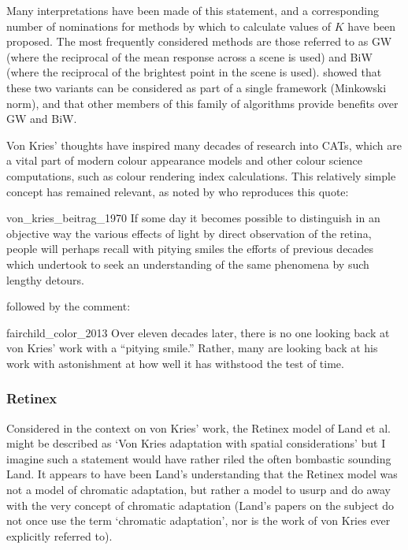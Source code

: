 Many interpretations have been made of this statement, and a corresponding number of nominations for methods by which to calculate values of $K$ have been proposed. The most frequently considered methods are those referred to as \acrfull{GW} (where the reciprocal of the mean response across a scene is used) and \acrfull{BiW} (where the reciprocal of the brightest point in the scene is used). \citet{finlayson_shades_2004} showed that these two variants can be considered as part of a single framework (Minkowski norm), and that other members of this family of algorithms provide benefits over \gls{GW} and \gls{BiW}.

Von Kries' thoughts have inspired many decades of research into \glspl{CAT}, which are a vital part of modern colour appearance models and other colour science computations, such as colour rendering index calculations. This relatively simple concept has remained relevant, as noted by \citet[p. 182]{fairchild_color_2013} who reproduces this quote:

\begin{citequote}{von_kries_beitrag_1970}
If some day it becomes possible to distinguish in an objective way the
various effects of light by direct observation of the retina, people will perhaps
recall with pitying smiles the efforts of previous decades which
undertook to seek an understanding of the same phenomena by such
lengthy detours.
\end{citequote}

followed by the comment:

\begin{citequote}{fairchild_color_2013}
Over eleven decades later, there is no one looking back at von Kries’ work
with a “pitying smile.” Rather, many are looking back at his work with
astonishment at how well it has withstood the test of time.
\end{citequote}

\subsubsection{Retinex}

Considered in the context on von Kries' work, the Retinex model of Land et al. \citep{land_retinex_1964,land_lightness_1971,land_recent_1983,land_recent_1986,mccann_quantitative_1976} might be described as `Von Kries adaptation with spatial considerations' but I imagine such a statement would have rather riled the often bombastic sounding Land. It appears to have been Land's understanding that the Retinex model was not a model of chromatic adaptation, but rather a model to usurp and do away with the very concept of chromatic adaptation (Land's papers on the subject \citep{land_retinex_1964,land_lightness_1971,land_recent_1983,land_recent_1986} do not once use the term `chromatic adaptation', nor is the work of von Kries ever explicitly referred to). 

